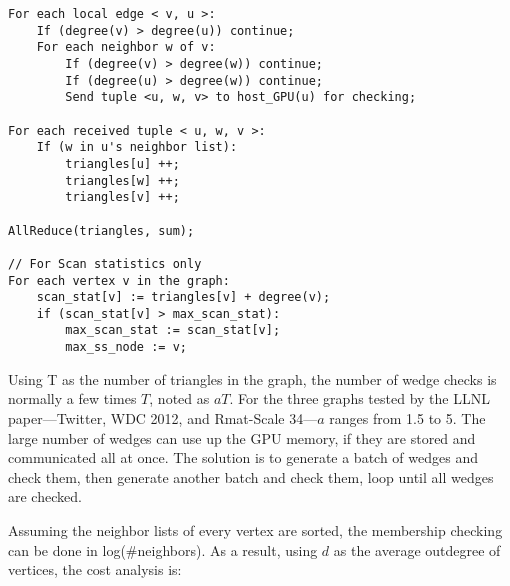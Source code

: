 \documentclass[10pt,oneside]{memoir}
\begin{document}
\begin{verbatim}
For each local edge < v, u >:
    If (degree(v) > degree(u)) continue;
    For each neighbor w of v:
        If (degree(v) > degree(w)) continue;
        If (degree(u) > degree(w)) continue;
        Send tuple <u, w, v> to host_GPU(u) for checking;

For each received tuple < u, w, v >:
    If (w in u's neighbor list):
        triangles[u] ++;
        triangles[w] ++;
        triangles[v] ++;

AllReduce(triangles, sum);

// For Scan statistics only
For each vertex v in the graph:
    scan_stat[v] := triangles[v] + degree(v);
    if (scan_stat[v] > max_scan_stat):
        max_scan_stat := scan_stat[v];
        max_ss_node := v;
\end{verbatim}

Using T as the number of triangles in the graph, the number of wedge
checks is normally a few times \(T\), noted as \(aT\). For the three
graphs tested by the LLNL paper---Twitter, WDC 2012, and Rmat-Scale
34---\(a\) ranges from 1.5 to 5. The large number of wedges can use up
the GPU memory, if they are stored and communicated all at once. The
solution is to generate a batch of wedges and check them, then generate
another batch and check them, loop until all wedges are checked.

Assuming the neighbor lists of every vertex are sorted, the membership
checking can be done in log(\#neighbors). As a result, using \(d\) as
the average outdegree of vertices, the cost analysis is:
\end{document}

